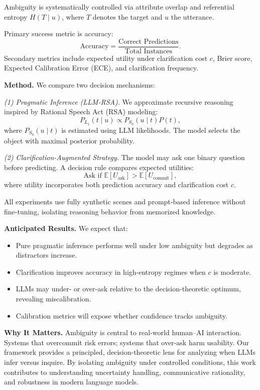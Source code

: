 Ambiguity is systematically controlled via attribute overlap and referential entropy $H(T \mid u)$, where $T$ denotes the target and $u$ the utterance.

Primary success metric is accuracy:
\[
\text{Accuracy} = \frac{\text{Correct Predictions}}{\text{Total Instances}}.
\]
Secondary metrics include expected utility under clarification cost $c$, Brier score, Expected Calibration Error (ECE), and clarification frequency.

\vspace{0.5em}
\noindent
\textbf{Method.}
We compare two decision mechanisms:

\textit{(1) Pragmatic Inference (LLM-RSA).}  
We approximate recursive reasoning inspired by Rational Speech Act (RSA) modeling:
\[
P_{L_1}(t \mid u) \propto P_{S_0}(u \mid t) P(t),
\]
where $P_{S_0}(u \mid t)$ is estimated using LLM likelihoods. The model selects the object with maximal posterior probability.

\textit{(2) Clarification-Augmented Strategy.}  
The model may ask one binary question before predicting. A decision rule compares expected utilities:
\[
\text{Ask if } \mathbb{E}[U_{\text{ask}}] > \mathbb{E}[U_{\text{commit}}],
\]
where utility incorporates both prediction accuracy and clarification cost $c$.

All experiments use fully synthetic scenes and prompt-based inference without fine-tuning, isolating reasoning behavior from memorized knowledge.

\vspace{0.5em}
\noindent
\textbf{Anticipated Results.}
We expect that:
\begin{itemize}
    \item Pure pragmatic inference performs well under low ambiguity but degrades as distractors increase.
    \item Clarification improves accuracy in high-entropy regimes when $c$ is moderate.
    \item LLMs may under- or over-ask relative to the decision-theoretic optimum, revealing miscalibration.
    \item Calibration metrics will expose whether confidence tracks ambiguity.
\end{itemize}

\vspace{0.5em}
\noindent
\textbf{Why It Matters.}
Ambiguity is central to real-world human--AI interaction. Systems that overcommit risk errors; systems that over-ask harm usability. Our framework provides a principled, decision-theoretic lens for analyzing when LLMs infer versus inquire. By isolating ambiguity under controlled conditions, this work contributes to understanding uncertainty handling, communicative rationality, and robustness in modern language models.

